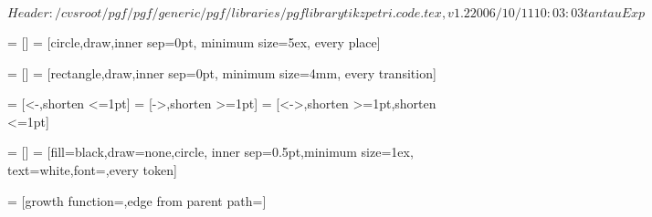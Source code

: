 %
%
%

\ProvidesFileRCS[v\pgfversion] $Header: /cvsroot/pgf/pgf/generic/pgf/libraries/pgflibrarytikzpetri.code.tex,v 1.2 2006/10/11 10:03:03 tantau Exp $



=           []
=                 [circle,draw,inner sep=0pt,
                                    minimum size=5ex,
                                    every place]



=      []
=            [rectangle,draw,inner sep=0pt,
                                    minimum size=4mm,
                                    every transition]



=                   [<-,shorten <=1pt]
=                  [->,shorten >=1pt]
=          [<->,shorten >=1pt,shorten <=1pt]




=           []
=                 [fill=black,draw=none,circle,
                                    inner sep=0.5pt,minimum size=1ex,
                                    text=white,font=\tiny,every token]

\def\tikz@token@distance{1.5ex}

=   [growth function=\tikz@grow@tokens,edge from parent path=]





